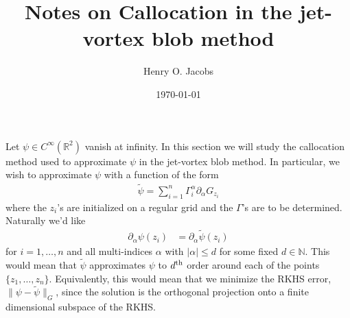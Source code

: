 \documentclass[12pt]{amsart}
\title{Notes on Callocation in the jet-vortex blob method}
\author{Henry O. Jacobs}
\date{\today}
\begin{document}
\maketitle

Let $\psi \in C^{\infty}(\mathbb{R}^2)$ vanish at infinity.
In this section we will study the callocation method used to approximate $\psi$ in the jet-vortex blob method.
In particular, we wish to approximate $\psi$ with a function of the form
\begin{align*}
  \tilde{\psi} = \sum_{i=1}^{n} \Gamma_i^\alpha \partial_\alpha G_{z_i}
\end{align*}
where the $z_i$'s are initialized on a regular grid and the $\Gamma$'s are to be determined.
Naturally we'd like
\begin{align}
  \partial_{\alpha}\psi(z_i) &= \partial_{\alpha}\tilde{\psi}(z_i) \label{eq:desired}
\end{align}
for $i=1,\dots,n$ and all multi-indices $\alpha$ with $| \alpha | \leq d$
for some fixed $d \in \mathbb{N}$.
This would mean that $\tilde{\psi}$ approximates $\psi$ to $d^{\rm th}$ order around each of the points $\{ z_1,\dots,z_n\}$.
Equivalently, this would mean that we minimize the RKHS error, $\| \psi - \tilde{\psi} \|_{G}$, since the solution is the orthogonal projection onto a finite dimensional subspace of the RKHS.
\end{document}
